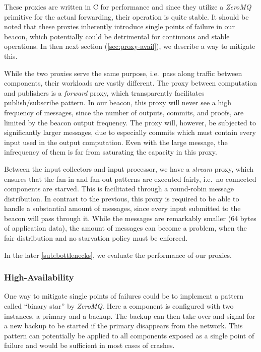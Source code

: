 These proxies are written in C for performance and since they utilize a \textit{ZeroMQ} primitive for the actual forwarding, their operation is quite stable.
It should be noted that these proxies inherently introduce single points of failure in our beacon, which potentially could be detrimental for continuous and stable operations. In then next section (\vref{sec:proxy-avail}), we describe a way to mitigate this.

While the two proxies serve the same purpose, i.e.\ pass along traffic between components, their workloads are vastly different.
The proxy between computation and publishers is a \textit{forward} proxy, which transparently facilitates publish/subscribe pattern.
In our beacon, this proxy will never see a high frequency of messages, since the number of outputs, commits, and proofs, are limited by the beacon output frequency.
The proxy will, however, be subjected to significantly larger messages, due to especially commits which must contain every input used in the output computation. Even with the large message, the infrequency of them is far from saturating the capacity in this proxy.

Between the input collectors and input processor, we have a \textit{stream} proxy, which ensures that the fan-in and fan-out patterns are executed fairly, i.e.\ no connected components are starved.
This is facilitated through a round-robin message distribution.
In contrast to the previous, this proxy is required to be able to handle a substantial amount of messages, since every input submitted to the beacon will pass through it.
While the messages are remarkably smaller (64 bytes of application data), the amount of messages can become a problem, when the fair distribution and no starvation policy must be enforced.

In the later \vref{sub:bottlenecks}, we evaluate the performance of our proxies.

\subsubsection{High-Availability}\label{sec:proxy-avail}
One way to mitigate single points of failures could be to implement a pattern called \enquote{binary star} by \textit{ZeroMQ}.
Here a component is configured with two instances, a primary and a backup.
The backup can then take over and signal for a new backup to be started if the primary disappears from the network.
This pattern can potentially be applied to all components exposed as a single point of failure and would be sufficient in most cases of crashes.

